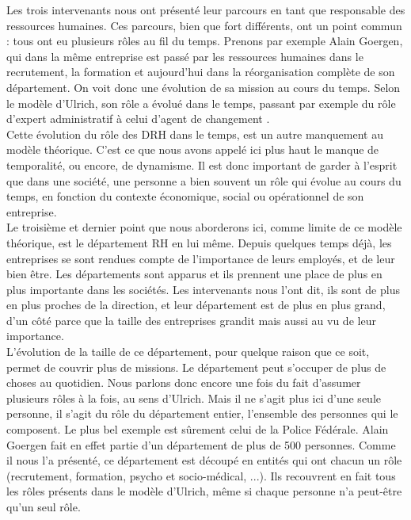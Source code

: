Les trois intervenants nous ont présenté leur parcours en tant que responsable des ressources humaines. Ces parcours, bien que fort différents, ont un point commun : tous ont eu plusieurs rôles au fil du temps. Prenons par exemple Alain Goergen, qui dans la même entreprise est passé par les ressources humaines dans le recrutement, la formation et aujourd'hui dans la réorganisation complète de son département. On voit donc une évolution de sa mission au cours du temps. Selon le modèle d'Ulrich, son rôle a évolué dans le temps, passant par exemple du rôle d'\og expert administratif \fg{} à celui d'\og agent de changement \fg{}. \\

Cette évolution du rôle des DRH dans le temps, est un autre manquement au modèle théorique. C'est ce que nous avons appelé ici plus haut le manque de temporalité, ou encore, de dynamisme. Il est donc important de garder à l'esprit que dans une société, une personne a bien souvent un rôle qui évolue au cours du temps, en fonction du contexte économique, social ou opérationnel de son entreprise. \\



Le troisième et dernier point que nous aborderons ici, comme limite de ce modèle théorique, est le département RH en lui même. Depuis quelques temps déjà, les entreprises se sont rendues compte de l'importance de leurs employés, et de leur bien être. Les départements sont apparus et ils prennent une place de plus en plus importante dans les sociétés. Les intervenants nous l'ont dit, ils sont de plus en plus proches de la direction, et leur département est de plus en plus grand, d'un côté parce que la taille des entreprises grandit mais aussi au vu de leur importance. \\

L'évolution de la taille de ce département, pour quelque raison que ce soit, permet de couvrir plus de missions. Le département peut s'occuper de plus de choses au quotidien. Nous parlons donc encore une fois du fait d'assumer plusieurs rôles à la fois, au sens d'Ulrich. Mais il ne s'agit plus ici d'une seule personne, il s'agit du rôle du département entier, l'ensemble des personnes qui le composent. Le plus bel exemple est sûrement celui de la Police Fédérale. Alain Goergen fait en effet partie d'un département de plus de 500 personnes. Comme il nous l'a présenté, ce département est découpé en entités qui ont chacun un rôle (recrutement, formation, psycho et socio-médical, ...). Ils recouvrent en fait tous les rôles présents dans le modèle d'Ulrich, même si chaque personne n'a peut-être qu'un seul rôle. \\

